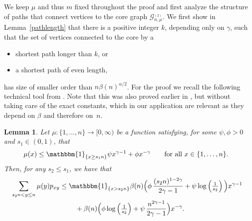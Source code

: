\documentclass[12pt,a4paper]{article}
\numberwithin{equation}{section}
\newtheorem{lemma}[shared]{Lemma}
\begin{document}
 We keep $\mu$ and thus $m$ fixed throughout the proof and first analyze the structure of paths that connect vertices to the core graph $\mathcal G_{n,\mu}^{_{(2)}}$. We first show in Lemma~\ref{pathlength} that there is a positive integer $k$, depending only on $\gamma$, such that the set of vertices connected to the core by a
\begin{itemize}
    \item shortest path longer than $k$, or
    \item a shortest path of even length,
\end{itemize} has size of smaller order than $n\beta(n)^{\alpha/2}$.  For the proof we recall the following technical tool from \cite[Lemma 1]{waw}. Note that this was also proved earlier in \cite{dmm}, but without taking care of the exact constants, which in our application are relevant as they depend on $\beta$ and therefore on~$n$. 

    \begin{lemma} \label{1.3}
		Let $\mu \colon\{1,\dots,n\}\to[0,\infty)$ be a function satisfying, for some $\psi, \phi >0$ and $s_1\in(0,1)$, that
		\begin{align*}
			\mu(x)\le \mathbbm{1}_{\{x\ge s_1 n\}}\psi x^{\gamma-1}+\phi x^{-\gamma}
            \qquad
		\text{for all $x\in\{1,\dots,n\}$. }
        \end{align*}
        Then, for any $s_2\le s_1 $,  we have that
		\begin{align*}
			\sum_{s_2 n<y\le n}\mu(y) p_{xy} & \le \mathbbm{1}_{\{x >s_2 n\}}\beta(n) \Big(\phi \,\frac{(s_2 n)^{1-2\gamma}}{2 \gamma -1}+\psi\log\left(\tfrac{1}{s_2}\right)\Big) x^{\gamma-1}\\& \phantom{xxxx} +\beta(n) \Big(\phi \log\left(\tfrac{1}{s_2}\right)+\psi\,\frac{n^{2 \gamma -1}}{2 \gamma -1}\Big) x^{-\gamma}.
		\end{align*}
	\end{lemma}
\end{document}
